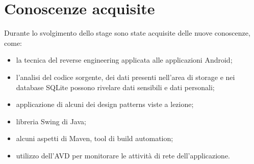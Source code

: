 
\section{Conoscenze acquisite}\label{sec:conoscenze-acquisite}
Durante lo svolgimento dello stage sono state acquisite delle nuove conoscenze, come:
\begin{itemize}\itemsep0em
    \item la tecnica del reverse engineering applicata alle applicazioni Android;
    \item l'analisi del codice sorgente, dei dati presenti nell'area di storage e nei database SQLite possono rivelare dati sensibili e dati personali;
    \item applicazione di alcuni dei design patterns viste a lezione;
    \item libreria Swing di Java;
    \item alcuni aspetti di Maven, tool di build automation;
    \item utilizzo dell'AVD per monitorare le attività di rete dell'applicazione.
\end{itemize}
